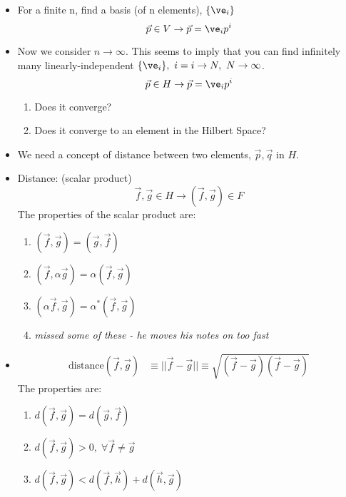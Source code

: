 \documentclass[cplx.tex]{subfiles}
\begin{document}
\begin{itemize}
    \item For a finite n, find a basis (of n elements), $\{\ve_i\}$
        \begin{equation}
            \vec{p}\in V \to \vec{p} = \ve_ip^i
        \end{equation}
    \item Now we consider $n\to\infty$.
        This seems to imply that you can find infinitely many linearly-independent $\{\ve_i\},~ i = i\to N,~ N\to\infty$.
        \begin{equation}
            \vec{p} \in H \to \vec{p} = \ve_ip^i
        \end{equation}
        \begin{enumerate}
            \item Does it converge?
            \item Does it converge to an element in the Hilbert Space?
        \end{enumerate}
    \item We need a concept of distance between two elements, $\vec{p},\vec{q}$ in $H$.
    \item Distance: (scalar product)
        \begin{equation}
            \vec{f},\vec{g} \in H \to (\vec{f},\vec{g})\in F
        \end{equation}
        The properties of the scalar product are:
        \begin{enumerate}
            \item $(\vec{f},\vec{g}) = (\vec{g},\vec{f})$
            \item $(\vec{f},\alpha\vec{g}) = \alpha(\vec{f},\vec{g})$
            \item $(\alpha\vec{f},\vec{g}) = \alpha^*(\vec{f},\vec{g})$
            \item \emph{missed some of these - he moves his notes on too fast}
        \end{enumerate}
    \item 
        \begin{align}
            \text{distance}(\vec{f},\vec{g}) &\equiv ||\vec{f}-\vec{g}|| \equiv \sqrt{(\vec{f}-\vec{g})(\vec{f}-\vec{g})} 
        \end{align}
        The properties are:
        \begin{enumerate}
            \item $d(\vec{f},\vec{g}) = d(\vec{g},\vec{f})$
            \item $d(\vec{f},\vec{g}) > 0,\; \forall \vec{f}\neq\vec{g}$
            \item $d(\vec{f},\vec{g}) < d(\vec{f},\vec{h})+d(\vec{h},\vec{g})$
        \end{enumerate}
\end{itemize}
\end{document}
